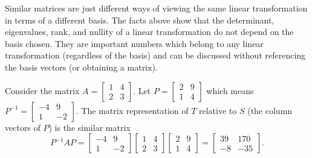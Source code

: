 Similar matrices are just different ways of viewing the same linear transformation in terms of a different basis. The facts above show that the determinant, eigenvalues, rank, and nullity of a linear transformation do not depend on the basis chosen. They are important numbers which belong to any linear transformation (regardless of the basis) and can be discussed without referencing the basis vectors (or obtaining a matrix).


\begin{example}
 Consider the matrix
 $A=  
\begin{bmatrix}
 1 & 4 \\
 2 & 3
\end{bmatrix} 
$. Let
$P=
\begin{bmatrix}
 2 & 9 \\
 1 & 4
\end{bmatrix} 
$ which means 
$P^{-1} = 
\begin{bmatrix}
 -4 & 9 \\
 1 & -2
\end{bmatrix} 
$. The matrix representation of $T$ relative to $S$ (the column vectors of $P$) is the similar matrix 
$$
P^{-1}AP=\begin{bmatrix}
 -4 & 9 \\
 1 & -2
\end{bmatrix} 
 \begin{bmatrix}
 1 & 4 \\
 2 & 3
\end{bmatrix} 
\begin{bmatrix}
 2 & 9 \\
 1 & 4
\end{bmatrix} 
=
\begin{bmatrix}
 39 & 170 \\
 -8 & -35
\end{bmatrix} 
.$$

\item


\end{example}
